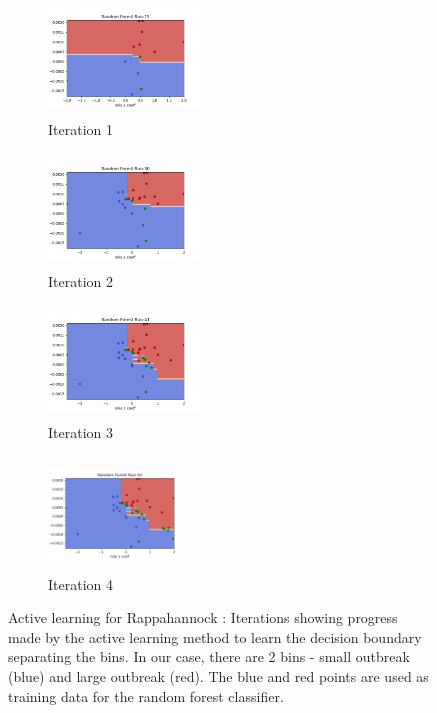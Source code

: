 \begin{figure}
\begin{subfigure}{.2\textwidth}
  \includegraphics[width=4cm,height=3cm]{AAMAS20Template-submission/figures/RAPP-random-forest-run15.png}
  \caption{Iteration 1}
  \label{fig:diagstdev}
\end{subfigure}%
\begin{subfigure}{.2\textwidth}
  \includegraphics[width=4cm,height=3cm]{AAMAS20Template-submission/figures/RAPP-random-forest-run30.png}
  \caption{Iteration 2}
  \label{fig:}
\end{subfigure}%
\begin{subfigure}{.2\textwidth}
  \includegraphics[width=4cm,height=3cm]{AAMAS20Template-submission/figures/RAPP-random-forest-run41.png}
  \caption{Iteration 3}
  \label{fig:}
  \end{subfigure}%
\begin{subfigure}{.2\textwidth}
  \includegraphics[width=3.7cm,height=3cm]{AAMAS20Template-submission/figures/RAPP-random-forest-run50.png}
  \caption{Iteration 4}
  \label{fig:}
\end{subfigure}
\caption{Active learning for Rappahannock : Iterations showing progress made by the active learning method to learn the decision boundary separating the bins. In our case, there are 2 bins - small outbreak (blue) and large outbreak (red). The blue and red points are used as training data for the random forest classifier.}
\label{fig:alProgress}
\end{figure}

